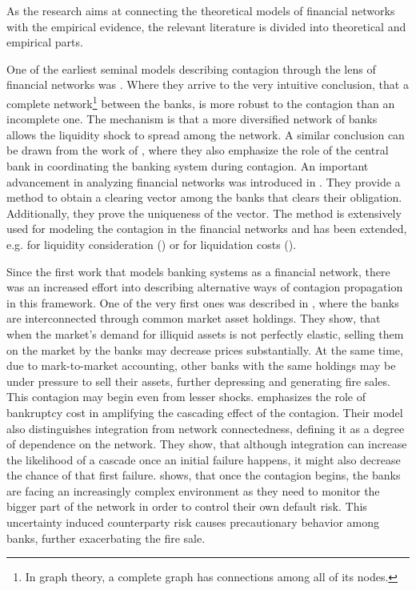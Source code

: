 \documentclass[12pt]{article}
\begin{document}
As the research aims at connecting the theoretical models of financial networks with the empirical evidence, the relevant literature is divided into theoretical and empirical parts.

One of the earliest seminal models describing contagion through the lens of financial networks was \cite{allen00}. Where they arrive to the very intuitive conclusion, that a complete network\footnote{In graph theory, a complete graph has connections among all of its nodes.} between the banks, is more robust to the contagion than an incomplete one. The mechanism is that a more diversified network of banks allows the liquidity shock to spread among the network. A similar conclusion can be drawn from the work of \cite{freixas00}, where they also emphasize the role of the central bank in coordinating the banking system during contagion. An important advancement in analyzing financial networks was introduced in \cite{eisenberg01}. They provide a method to obtain a clearing vector among the banks that clears their obligation. Additionally, they prove the uniqueness of the vector. The method is extensively used for modeling the contagion in the financial networks and has been extended, e.g. for liquidity consideration (\cite{cifuentes05}) or for liquidation costs (\cite{rogers13}). 

Since the first work that models banking systems as a financial network, there was an increased effort into describing alternative ways of contagion propagation in this framework. One of the very first ones was described in \cite{cifuentes05}, where the banks are interconnected through common market asset holdings. They show, that when the market's demand for illiquid assets is not perfectly elastic, selling them on the market by the banks may decrease prices substantially. At the same time, due to mark-to-market accounting, other banks with the same holdings may be under pressure to sell their assets, further depressing and generating fire sales. This contagion may begin even from lesser shocks. \citet{elliot14} emphasizes the role of bankruptcy cost in amplifying the cascading effect of the contagion. Their model also distinguishes integration from network connectedness, defining it as a degree of dependence on the network. They show, that although integration can increase the likelihood of a cascade once an initial failure happens, it might also decrease the chance of that first failure. \cite{caballero13} shows, that once the contagion begins, the banks are facing an increasingly complex environment as they need to monitor the bigger part of the network in order to control their own default risk. This uncertainty induced counterparty risk causes precautionary behavior among banks, further exacerbating the fire sale.
\end{document}
